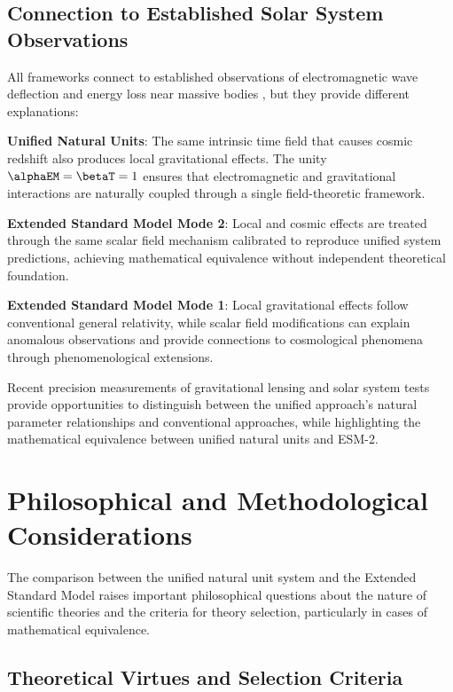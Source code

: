 	\subsection{Connection to Established Solar System Observations}
	\label{subsec:solar_system_observations}
	
	All frameworks connect to established observations of electromagnetic wave deflection and energy loss near massive bodies \cite{Adams1925,Pound1960,Bertotti2003,Shapiro1971}, but they provide different explanations:
	
	\textbf{Unified Natural Units}: The same intrinsic time field that causes cosmic redshift also produces local gravitational effects. The unity $\alphaEM = \betaT = 1$ ensures that electromagnetic and gravitational interactions are naturally coupled through a single field-theoretic framework.
	
	\textbf{Extended Standard Model Mode 2}: Local and cosmic effects are treated through the same scalar field mechanism calibrated to reproduce unified system predictions, achieving mathematical equivalence without independent theoretical foundation.
	
	\textbf{Extended Standard Model Mode 1}: Local gravitational effects follow conventional general relativity, while scalar field modifications can explain anomalous observations and provide connections to cosmological phenomena through phenomenological extensions.
	
	Recent precision measurements of gravitational lensing and solar system tests \cite{Bolton2008,Suyu2017} provide opportunities to distinguish between the unified approach's natural parameter relationships and conventional approaches, while highlighting the mathematical equivalence between unified natural units and ESM-2.
	
	\section{Philosophical and Methodological Considerations}
	\label{sec:philosophical_considerations}
	
	The comparison between the unified natural unit system and the Extended Standard Model raises important philosophical questions about the nature of scientific theories and the criteria for theory selection, particularly in cases of mathematical equivalence.
	
	\subsection{Theoretical Virtues and Selection Criteria}
	\label{subsec:theoretical_virtues}
	
